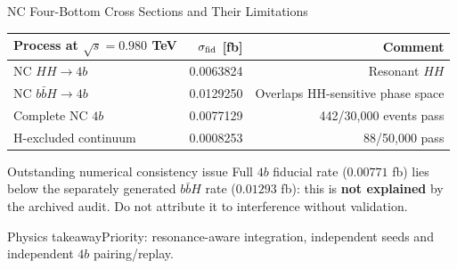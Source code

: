 \documentclass[aspectratio=1610,english]{beamer}
\newcommand{\src}[1]{\vfill{\par\color{black!65}\fontsize{6.4}{7.4}\selectfont\emph{Source:} #1\par}}
\newcommand{\key}[1]{\begin{alertblock}{Physics takeaway}\small  #1\end{alertblock}}
\begin{document}
\begin{frame}[t]{NC Four-Bottom Cross Sections and Their Limitations}
\small

\begin{center}\setlength{\tabcolsep}{7pt}
\begin{tabular}{lrr}\toprule
Process at $\sqrt{s}=0.980$ TeV & $\sigma_{\rm fid}$ [fb] & Comment\\\midrule
NC $HH\to4b$ & 0.0063824 & Resonant $HH$\\
NC $b\bar bH\to4b$ & 0.0129250 & Overlaps HH-sensitive phase space\\
Complete NC $4b$ & 0.0077129 & 442/30,000 events pass\\
H-excluded continuum & 0.0008253 & 88/50,000 pass\\\bottomrule
\end{tabular}\end{center}
\begin{alertblock}{Outstanding numerical consistency issue}
\justifying 
Full $4b$ fiducial rate ($0.00771$ fb) lies below the separately generated $b\bar bH$ rate ($0.01293$ fb): this is \textbf{not explained} by the archived audit. Do not attribute it to interference without validation.
\end{alertblock}
\key{\justifying Priority: resonance-aware integration, independent seeds and independent $4b$ pairing/replay.}

\end{frame}
\end{document}
